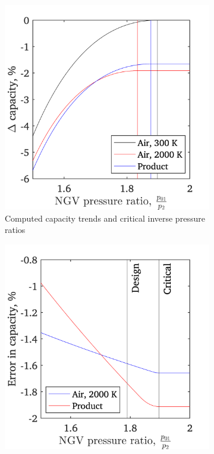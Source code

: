 \documentclass[a4paper, 11pt, oneside]{report}
\begin{document}
\begin{figure}[H]
	\centering
	\begin{subfigure}{.45\textwidth}
		\centering
		\includegraphics[width=\linewidth]{figs/combustion_products_capacities.png}
		\caption{Computed capacity trends and critical inverse pressure ratios}
		\label{fig:combustion_products_capacities_trends}
	\end{subfigure}
	\hspace{0.05\textwidth}
	\begin{subfigure}{.45\textwidth}
		\centering
		\includegraphics[width=\linewidth]{figs/combustion_products_capacities_errors.png}

\end{subfigure}
\end{figure}
\end{document}
